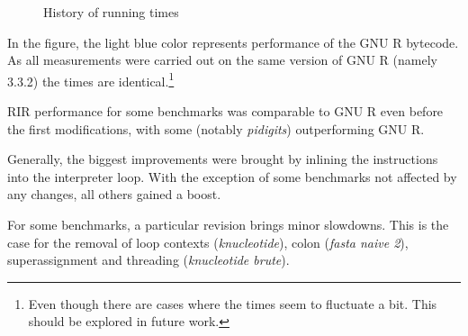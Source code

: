 \begin{figure}[htbp]
  \caption{\label{fig:history}History of running times}
  \centering
\end{figure}

In the figure, the light blue color represents performance of the GNU R bytecode. As all measurements were carried out on the same version of GNU R (namely 3.3.2) the times are identical.\footnote{Even though there are cases where the times seem to fluctuate a bit. This should be explored in future work.}

RIR performance for some benchmarks was comparable to GNU R even before the first modifications, with some (notably \emph{pidigits}) outperforming GNU R.


Generally, the biggest improvements were brought by inlining the instructions into the interpreter loop. With the exception of some benchmarks not affected by any changes, all others gained a boost.


For some benchmarks, a particular revision brings minor slowdowns. This is the case for the removal of loop contexts (\emph{knucleotide}), colon (\emph{fasta naive 2}), superassignment and threading (\emph{knucleotide brute}).

